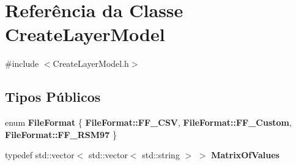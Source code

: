 \section{Referência da Classe Create\+Layer\+Model}
\label{class_create_layer_model}


{\ttfamily \#include $<$Create\+Layer\+Model.\+h$>$}

\subsection*{Tipos Públicos}
\begin{DoxyCompactItemize}
\item 
enum {\bf File\+Format} \{ {\bf File\+Format\+::\+F\+F\+\_\+\+C\+SV}, 
{\bf File\+Format\+::\+F\+F\+\_\+\+Custom}, 
{\bf File\+Format\+::\+F\+F\+\_\+\+R\+S\+M97}
 \}
\item 
typedef std\+::vector$<$ std\+::vector$<$ std\+::string $>$ $>$ {\bf Matrix\+Of\+Values}
\end{DoxyCompactItemize}
